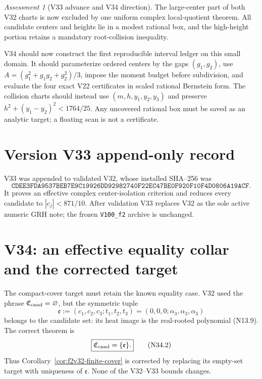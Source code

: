 \documentclass[11pt]{article}
\theoremstyle{definition}
\theoremstyle{remark}
\newtheorem{assessment}[theorem]{Assessment}
\begin{document}
\begin{assessment}[V33 advance and V34 direction]
\label{ass:f2v33}
The large-center part of both V32 charts is now excluded by one uniform
complex local-quotient theorem.  All candidate centers and heights lie in
a modest rational box, and the high-height portion retains a mandatory
root-collision inequality.

V34 should now construct the first reproducible interval ledger on this
small domain.  It should parameterize ordered centers by the gaps
\((g_1,g_2)\), use \(A=(g_1^2+g_1g_2+g_2^2)/3\), impose the moment budget
before subdivision, and evaluate the four exact V22 certificates in
scaled rational Bernstein form.  The collision charts should instead use
\((m,h,y_1,y_2,y_3)\) and preserve
\(h^2+(y_1-y_2)^2<1764/25\).  Any uncovered rational box must be saved as
an analytic target; a floating scan is not a certificate.
\end{assessment}

\section*{Version V33 append-only record}

V33 was appended to validated V32, whose installed SHA--256 was
\[
 \texttt{CDEE3FDA9537BEB7E9C19926DD92982740F22EC47BE0F920F10F4D0806A19ACF}.
 \tag{N33.35}
\]
It proves an effective complex center-isolation criterion and reduces every
candidate to \(|c_j|<871/10\).  After validation V33 replaces V32 as the
sole active numeric GRH note; the frozen \texttt{V100\_f2} archive is
unchanged.



\section{V34: an effective equality collar and the corrected target}
\label{sec:f2v34-equality-collar}

The compact-cover target must retain the known equality case.  V32 used the
phrase \(\mathfrak C_{\rm cand}=\varnothing\), but the symmetric tuple
\[
 \mathfrak e:=
 (c_1,c_2,c_3;t_1,t_2,t_3)
 =(0,0,0;\alpha_3,\alpha_3,\alpha_3)
 \tag{N34.1}
\]
belongs to the candidate set: its heat image is the real-rooted polynomial
\textup{(N13.9)}.  The correct theorem is
\[
 \boxed{\mathfrak C_{\rm cand}=\{\mathfrak e\}.}
 \tag{N34.2}
\]
Thus Corollary~\ref{cor:f2v32-finite-cover} is corrected by replacing its
empty-set target with uniqueness of \(\mathfrak e\).  None of the
V32--V33 bounds changes.
\end{document}
